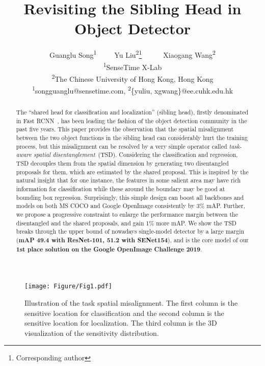 \documentclass[10pt,twocolumn,letterpaper]{article}
\def \algfullname{\emph{task-aware spatial disentanglement}}
\def \algname{TSD}
\begin{document}
\title{Revisiting the Sibling Head in Object Detector}

\author{Guanglu Song\textsuperscript{\rm 1}\ \ \ \ \  Yu Liu\textsuperscript{\rm 2}\thanks{Corresponding author}\ \ \ \ \ \  Xiaogang Wang\textsuperscript{\rm 2} \\
\textsuperscript{\rm 1}SenseTime X-Lab\\
\textsuperscript{\rm 2}The Chinese University of Hong Kong, Hong Kong\\
\textsuperscript{\rm 1}songguanglu@sensetime.com, \textsuperscript{\rm 2}\{yuliu, xgwang\}@ee.cuhk.edu.hk
}

\maketitle


\begin{abstract}
   The ``shared head for classification and localization'' (sibling head), firstly denominated in Fast RCNN~\cite{girshick2015fast}, has been leading the fashion of the object detection community in the past five years. 
This paper provides the observation that the spatial misalignment between the two object functions in the sibling head can considerably hurt the training process, but this misalignment can be resolved by a very simple operator called \algfullname{}~(\algname{}). Considering the classification and regression, \algname{} decouples them from the spatial dimension by generating two disentangled proposals for them, which are estimated by the shared proposal. This is inspired by the natural insight that for one instance, the features in some salient area may have rich information for classification while these around the boundary may be good at bounding box regression. Surprisingly, this simple design can boost all backbones and models on both MS COCO and Google OpenImage consistently by 3\% mAP. Further, we propose a progressive constraint to enlarge the performance margin between the disentangled and the shared proposals, and gain 1\% more mAP. We show the \algname{} breaks through the upper bound of nowadays single-model detector by a large margin (\textbf{mAP 49.4 with ResNet-101, 51.2 with SENet154}), and is the core model of our \textbf{1st place solution on the Google OpenImage Challenge 2019}.

   
   
\end{abstract}

\begin{figure}[t]
\centering
\texttt{[image: Figure/Fig1.pdf]}
   \caption{Illustration of the task spatial misalignment. The first column is the sensitive location for classification and the second column is the sensitive location for localization. The third column is the 3D visualization of the sensitivity distribution.}
\label{fig:moti}
\end{figure}
\end{document}
